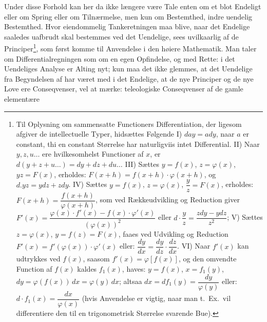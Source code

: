 \documentclass[12pt]{book}
\newcommand{\opage}[1]{\marginnote{\footnotesize\textit{[#1]}}}
\begin{document}
Under disse Forhold kan her da ikke længere være Tale enten om et blot Endeligt
eller om Spring eller om Tilnærmelse, men kun om Bestemthed, indre uendelig
Bestemthed.
\opage{59} Hvor eiendommelig Tankeretningen maa blive, naar det Endelige saaledes uafbrudt
skal bestemmes ved det Uendelige, sees uvilkaarlig af de Principer\footnote{Til
Oplysning om sammensatte Functioners Differentiation, der ligesom afgiver de
intellectuelle Typer, hidsættes Følgende I) $day = ady$, naar $a$ er constant, thi
en constant Størrelse har naturligviis intet Differential. II) Naar $y, z, u \dots$
ere hvilkesomhelst Functioner af $x$, er $d(y + z + u \dots) = dy + dz + du \dots$
III) Sættes $y = f(x)$, $z = \varphi(x)$, $yz = F(x)$, erholdes:
$F(x + h) = f(x + h)\cdot\varphi(x + h)$, og $d.yz = ydz + zdy$. IV) Sættes
$y = f(x)$, $z = \varphi(x)$, $\dfrac{y}{z} = F(x)$, erholdes:
$F(x + h) = \dfrac{f(x + h)}{\varphi(x + h)}$, som ved Rækkeudvikling og Reduction
giver $F'(x) = \dfrac{\varphi(x)\cdot f'(x) - f(x)\cdot\varphi'(x)}{(\varphi(x))^{2}}$
eller $d\cdot\dfrac{y}{z} = \dfrac{zdy - ydz}{z^{2}}$; V) Sættes $z = \varphi(x)$,
$y = f(z) = F(x)$, faaes ved Udvikling og Reduction
$F'(x) = f'(\varphi(x))\cdot\varphi'(x)$ eller:
$\dfrac{dy}{dx} = \dfrac{dy}{dz}\cdot\dfrac{dz}{dx}$. VI) Naar $f'(x)$ kan udtrykkes
ved $f(x)$, saasom $f'(x) = \varphi[f(x)]$, og den omvendte Function af $f(x)$ kaldes
$f_{1}(x)$, haves: $y = f(x)$, $x = f_{1}(y)$,
$dy = \varphi(f(x))\,dx = \varphi(y)\,dx$; altsaa
$dx = d f_{1}(y) = \dfrac{dy}{\varphi(y)}$ eller:
$d\cdot f_{1}(x) = \dfrac{dx}{\varphi(x)}$ (hvis Anvendelse er vigtig, naar man
t.\ Ex.\ vil differentiere den til en trigonometrisk Størrelse svarende Bue).}, som
først komme til Anvendelse i den høiere Mathematik. Man taler om
Differentialregningen som om en egen Opfindelse, og med Rette: i det Uendeliges
Analyse er Alting nyt; kun maa det ikke glemmes, at det Uendelige fra Begyndelsen af
har været med i det Endelige, at de nye Principer og de nye Love ere Conseqvenser,
vel at mærke: teleologiske Conseqvenser af de gamle elementære
\end{document}
